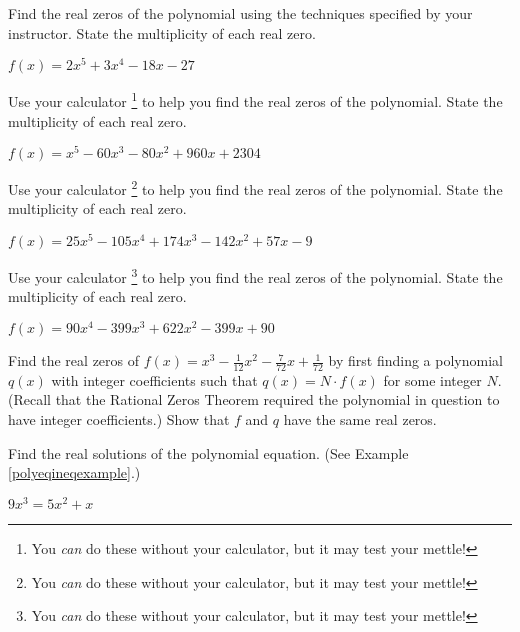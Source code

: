 \documentclass{ximera}
\begin{document}
\begin{problem}\label{findrealzerosexerlast}
Find the real zeros of the polynomial using the techniques specified by your instructor.  State the multiplicity of each real zero.

$f(x) = 2x^5+3x^4-18x-27$ 
\end{problem}

\begin{problem}\label{realzeroswcalcfirst}
Use your calculator \footnote{You \textit{can} do these without your calculator, but it may test your mettle!} to help you find the real zeros of the polynomial.  State the multiplicity of each real zero.

$f(x) = x^{5} - 60x^{3} - 80x^{2} + 960x + 2304$
\end{problem}

\begin{problem}
Use your calculator \footnote{You \textit{can} do these without your calculator, but it may test your mettle!} to help you find the real zeros of the polynomial.  State the multiplicity of each real zero.

$f(x) = 25x^{5} - 105x^{4} + 174x^{3} - 142x^{2} + 57x - 9$
\end{problem}

\begin{problem}\label{realzeroswcalclast}
Use your calculator \footnote{You \textit{can} do these without your calculator, but it may test your mettle!} to help you find the real zeros of the polynomial.  State the multiplicity of each real zero.

$f(x) = 90x^{4} - 399x^{3} + 622x^{2} - 399x + 90$ 
\end{problem}

\begin{problem}
Find the real zeros of $f(x) = x^{3} - \frac{1}{12}x^{2} - \frac{7}{72}x + \frac{1}{72}$ by first finding a polynomial $q(x)$ with integer coefficients such that $q(x) = N \cdot f(x)$ for some integer $N$.  (Recall that the Rational Zeros Theorem required the polynomial in question to have integer coefficients.) Show that $f$ and $q$ have the same real zeros.
\end{problem}

\begin{problem}\label{polyequexerfirst}
Find the real solutions of the polynomial equation.  (See Example \ref{polyeqineqexample}.)

$9x^{3} = 5x^{2} + x$ 
\end{problem}
  
\end{document}
